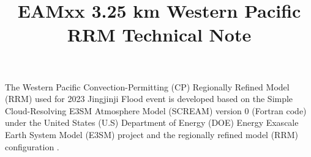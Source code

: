 \documentclass[journal abbreviation, manuscript]{copernicus}
\begin{document}
\title{\textbf{EAMxx 3.25 km Western Pacific RRM Technical Note}}














\received{}
\pubdiscuss{} %
\revised{}
\accepted{}
\published{}




\maketitle




\introduction
The Western Pacific Convection-Permitting (CP) Regionally Refined Model (RRM) used for 2023 Jingjinji Flood event is developed based on the Simple Cloud-Resolving E3SM Atmosphere Model (SCREAM) version 0 (Fortran code) under the United States (U.S) Department of Energy (DOE) Energy Exascale Earth System Model (E3SM) project \citep{Caldwell2021} and the regionally refined model (RRM) configuration \citep{Tang2019,Tang2023,Zhang2024,Bogenschutz2024}. 
\end{document}
